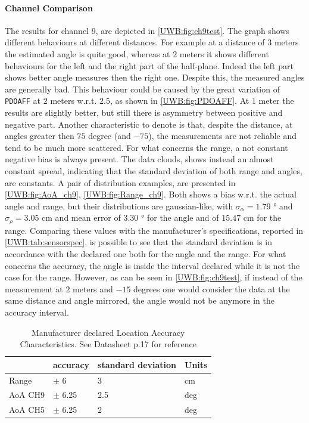 \paragraph{Channel Comparison}
The results for channel 9, are depicted in \autoref{UWB:fig:ch9test}. The graph shows different behaviours at different distances. For example at a distance of $3$ meters the estimated angle is quite good, whereas at $2$ meters it shows different behaviours for the left and the right part of the half-plane. Indeed the left part shows better angle measures then the right one. Despite this, the measured angles are generally bad. This behaviour could be caused by the great variation of \texttt{PDOAFF} at $2$ meters w.r.t. $2.5$, as shown in \autoref{UWB:fig:PDOAFF}. At $1$ meter the results are slightly better, but still there is asymmetry between positive and negative part. Another characteristic  to denote is that, despite the distance, at angles greater then $75$ degree (and $-75$), the measurements are not reliable and tend to be much more scattered. For what concerns the range, a not constant negative bias is always present. The data clouds, shows instead an almost constant spread, indicating that the standard deviation of both range and angles, are constants. A pair of distribution examples, are presented in \autoref{UWB:fig:AoA_ch9}, \ref{UWB:fig:Range_ch9}. Both shows a bias w.r.t. the actual angle and range, but their distributions are gaussian-like, with $\sigma_{\alpha} = 1.79$ ° and $\sigma_{\rho} = 3.05$ cm and mean error of $3.30$ ° for the angle and of $15.47$ cm for the range. Comparing these values with the manufacturer's specifications, reported in \autoref{UWB:tab:sensorspec}, is possible to see that the standard deviation is in accordance with the declared one both for the angle and the range. For what concerns the accuracy, the angle is inside the interval declared while it is not the case for the range. However, as can be seen in \autoref{UWB:fig:ch9test}, if instead of the measurement at $2$ meters and $-15$ degrees one would consider the data at the same distance and angle mirrored, the angle would not be anymore in the accuracy interval.\\

\begin{table}
    \centering
    \caption{Manufacturer declared Location Accuracy Characteristics. See Datasheet p.17 for reference\cite{UWBDatasheet}}
    \begin{tabular}{ | m{1.5cm} | m{1.5cm}| m{2.1cm} | m{0.7cm} |} 
        \hline
        &  accuracy & standard deviation & Units\\ 
        \hline
        Range & $\pm $ 6 & 3 & cm\\ 
        \hline
        AoA CH9 &$\pm$ 6.25 & 2.5 & deg \\
        \hline
        AoA CH5 &$\pm$ 6.25 & 2 & deg \\
        \hline
    \end{tabular}
    \label{UWB:tab:sensorspec}
\end{table}

